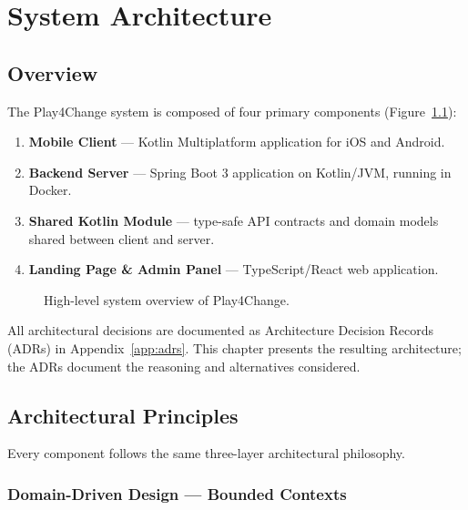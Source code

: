 %
%
\chapter{System Architecture}
\label{cha:architecture}

\section{Overview}
\label{sec:arch_overview}

The Play4Change system is composed of four primary components (Figure~\ref{fig:system_overview}):

\begin{enumerate}
    \item \textbf{Mobile Client} — Kotlin Multiplatform application for iOS and Android.
    \item \textbf{Backend Server} — Spring Boot 3 application on Kotlin/JVM, running in Docker.
    \item \textbf{Shared Kotlin Module} — type-safe API contracts and domain models shared between client and server.
    \item \textbf{Landing Page \& Admin Panel} — TypeScript/React web application.
\end{enumerate}

\begin{figure}[htbp]
    \centering
    \caption{High-level system overview of Play4Change.}
    \label{fig:system_overview}
\end{figure}

All architectural decisions are documented as Architecture Decision Records (ADRs) in Appendix~\ref{app:adrs}. This chapter presents the resulting architecture; the ADRs document the reasoning and alternatives considered.

\section{Architectural Principles}
\label{sec:arch_principles}

Every component follows the same three-layer architectural philosophy.

\subsection{Domain-Driven Design — Bounded Contexts}
\label{ssec:ddd_impl}


